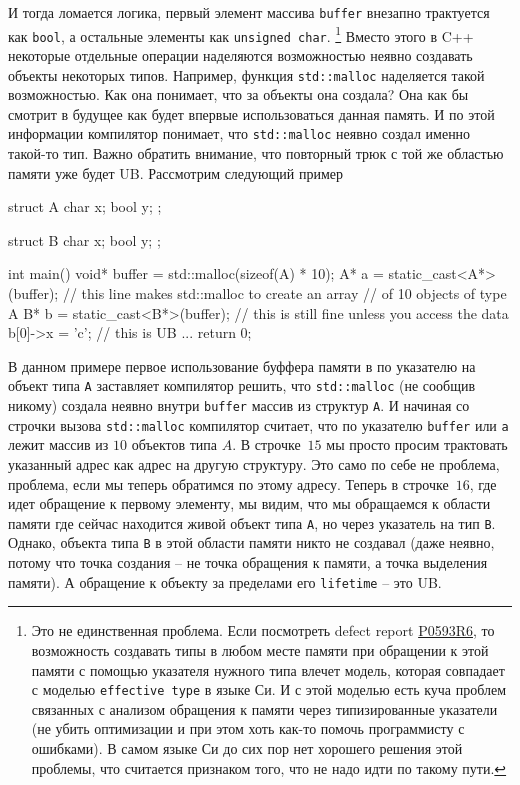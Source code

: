 \documentclass{article}
\begin{document}
И тогда ломается логика, первый элемент массива \verb"buffer" внезапно трактуется как \verb"bool", а остальные элементы как \verb"unsigned char".%
\footnote{
Это не единственная проблема.
Если посмотреть defect report \href{https://www.open-std.org/jtc1/sc22/wg21/docs/papers/2020/p0593r6.html}{P0593R6}, то возможность создавать типы в любом месте памяти при обращении к этой памяти с помощью указателя нужного типа влечет модель, которая совпадает с моделью \verb"effective type" в языке Си.
И с этой моделью есть куча проблем связанных с анализом обращения к памяти через типизированные указатели (не убить оптимизации и при этом хоть как-то помочь программисту с ошибками).
В самом языке Си до сих пор нет хорошего решения этой проблемы, что считается признаком того, что не надо идти по такому пути.
}
Вместо этого в C++ некоторые отдельные операции наделяются возможностью неявно создавать объекты некоторых типов.
Например, функция \verb"std::malloc" наделяется такой возможностью.
Как она понимает, что за объекты она создала?
Она как бы смотрит в будущее как будет впервые использоваться данная память.
И по этой информации компилятор понимает, что \verb"std::malloc" неявно создал именно такой-то тип.
Важно обратить внимание, что повторный трюк с той же областью памяти уже будет UB.
Рассмотрим следующий пример
\begin{cppcode}
struct A {
  char x;
  bool y;
};

struct B {
  char x;
  bool y;
};

int main() {
  void* buffer = std::malloc(sizeof(A) * 10);
  A* a = static_cast<A*>(buffer); // this line makes std::malloc to create an array
                                  // of 10 objects of type A
  B* b = static_cast<B*>(buffer); // this is still fine unless you access the data
  b[0]->x = 'c';                  // this is UB
  ...
  return 0;
}
\end{cppcode}
В данном примере первое использование буффера памяти в по указателю на объект типа \verb"A" заставляет компилятор решить, что \verb"std::malloc" (не сообщив никому) создала неявно внутри \verb"buffer" массив из структур \verb"A".
И начиная со строчки вызова \verb"std::malloc" компилятор считает, что по указателю \verb"buffer" или \verb"a" лежит массив из $10$ объектов типа $A$.
В строчке~$15$ мы просто просим трактовать указанный адрес как адрес на другую структуру.
Это само по себе не проблема, проблема, если мы теперь обратимся по этому адресу.
Теперь в строчке~$16$, где идет обращение к первому элементу, мы видим, что мы обращаемся к области памяти где сейчас находится живой объект типа \verb"A", но через указатель на тип \verb"B".
Однако, объекта типа \verb"B" в этой области памяти никто не создавал (даже неявно, потому что точка создания -- не точка обращения к памяти, а точка выделения памяти).
А обращение к объекту за пределами его \verb"lifetime" -- это UB.
\end{document}
